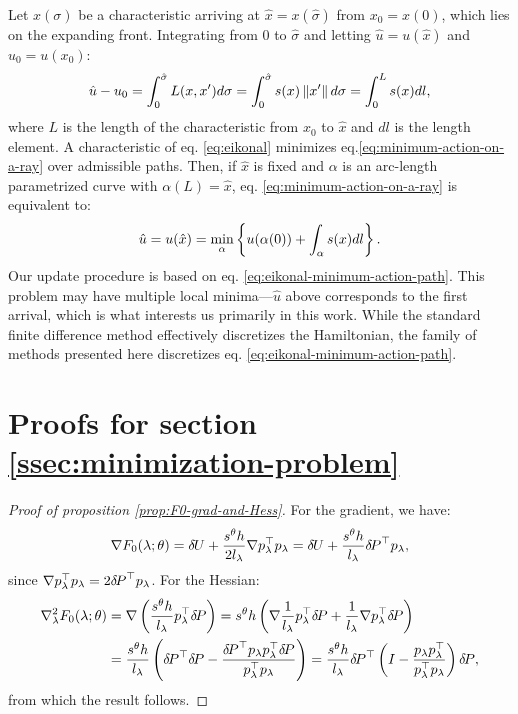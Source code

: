 \documentclass[smallcondensed]{svjour3}
\begin{document}
Let $x(\sigma)$ be a characteristic arriving at
$\hat{x} = x(\hat\sigma)$ from $x_0 = x(0)$, which lies on the
expanding front. Integrating from $0$ to $\hat\sigma$ and letting
$\hat u = u(\hat x)$ and $u_0 = u(x_0)$:
\begin{equation}
  \label{eq:minimum-action-on-a-ray}
  \hat u - u_0 = \int_{0}^{\hat\sigma} L(x, x') d\sigma = \int_{0}^{\hat\sigma} s(x) \left\|x'\right\| d\sigma = \int_0^L s(x) dl,
\end{equation}
where $L$ is the length of the characteristic from $x_0$ to $\hat{x}$
and $dl$ is the length element. A characteristic of eq.\@
\ref{eq:eikonal} minimizes eq.\@ \ref{eq:minimum-action-on-a-ray}
over admissible paths. Then, if $\hat{x}$ is fixed and $\alpha$ is an
arc-length parametrized curve with $\alpha(L) = \hat{x}$, eq.\@
\ref{eq:minimum-action-on-a-ray} is equivalent to:
\begin{equation}\label{eq:eikonal-minimum-action-path}
  \hat{u} = u(\hat{x}) = \min_\alpha \left\{u(\alpha(0)) + \int_\alpha s(x) dl\right\}.
\end{equation}
Our update procedure is based on eq.\@
\ref{eq:eikonal-minimum-action-path}. This problem may have multiple
local minima---$\hat{u}$ above corresponds to the first arrival, which
is what interests us primarily in this work. While the standard finite
difference method effectively discretizes the Hamiltonian, the family
of methods presented here discretizes eq.\@
\ref{eq:eikonal-minimum-action-path}.

\section{Proofs for section\@
  \ref{ssec:minimization-problem}}\label{sec:minimization-proofs}

\begin{proof}[Proof of proposition \ref{prop:F0-grad-and-Hess}]
  For the gradient, we have:
  \begin{equation*}
    \nabla F_0(\lambda; \theta) = {\delta \hspace{-0.09em} U} + \frac{s^{\theta} h}{2 l_\lambda} \nabla p_\lambda^\top p_\lambda = {\delta \hspace{-0.09em} U} + \frac{s^{\theta} h}{l_\lambda} {\delta \hspace{-0.14em} P}^\top p_\lambda,
  \end{equation*}
  since
  $\nabla p_\lambda^\top p_\lambda = 2 {\delta \hspace{-0.14em} P}^\top
  p_\lambda$. For the Hessian:
  \begin{align*}
    \nabla^2_\lambda F_0(\lambda; \theta) &= \nabla \left(\frac{s^{\theta} h}{l_\lambda} p_\lambda^\top {\delta \hspace{-0.14em} P}\right) = s^{\theta} h \left(\nabla \frac{1}{l_\lambda} p_\lambda^\top {\delta \hspace{-0.14em} P} + \frac{1}{l_\lambda} \nabla p_\lambda^\top {\delta \hspace{-0.14em} P}\right) \\
    &= \frac{s^{\theta} h}{l_\lambda} \left({\delta \hspace{-0.14em} P}^\top {\delta \hspace{-0.14em} P} - \frac{{\delta \hspace{-0.14em} P}^\top p_\lambda p_\lambda^\top {\delta \hspace{-0.14em} P}}{p_\lambda^\top p_\lambda}\right) = \frac{s^{\theta} h}{l_\lambda} {\delta \hspace{-0.14em} P}^\top \left(I - \frac{p_\lambda p_\lambda^\top}{p_\lambda^\top p_\lambda}\right) {\delta \hspace{-0.14em} P},
  \end{align*}
  from which the result follows.
\end{proof}
\end{document}
